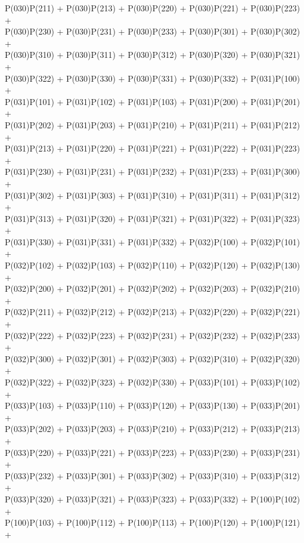 P(030)P(211) + P(030)P(213) + P(030)P(220) + P(030)P(221) + P(030)P(223) +\\
P(030)P(230) + P(030)P(231) + P(030)P(233) + P(030)P(301) + P(030)P(302) +\\
P(030)P(310) + P(030)P(311) + P(030)P(312) + P(030)P(320) + P(030)P(321) +\\
P(030)P(322) + P(030)P(330) + P(030)P(331) + P(030)P(332) + P(031)P(100) +\\
P(031)P(101) + P(031)P(102) + P(031)P(103) + P(031)P(200) + P(031)P(201) +\\
P(031)P(202) + P(031)P(203) + P(031)P(210) + P(031)P(211) + P(031)P(212) +\\
P(031)P(213) + P(031)P(220) + P(031)P(221) + P(031)P(222) + P(031)P(223) +\\
P(031)P(230) + P(031)P(231) + P(031)P(232) + P(031)P(233) + P(031)P(300) +\\
P(031)P(302) + P(031)P(303) + P(031)P(310) + P(031)P(311) + P(031)P(312) +\\
P(031)P(313) + P(031)P(320) + P(031)P(321) + P(031)P(322) + P(031)P(323) +\\
P(031)P(330) + P(031)P(331) + P(031)P(332) + P(032)P(100) + P(032)P(101) +\\
P(032)P(102) + P(032)P(103) + P(032)P(110) + P(032)P(120) + P(032)P(130) +\\
P(032)P(200) + P(032)P(201) + P(032)P(202) + P(032)P(203) + P(032)P(210) +\\
P(032)P(211) + P(032)P(212) + P(032)P(213) + P(032)P(220) + P(032)P(221) +\\
P(032)P(222) + P(032)P(223) + P(032)P(231) + P(032)P(232) + P(032)P(233) +\\
P(032)P(300) + P(032)P(301) + P(032)P(303) + P(032)P(310) + P(032)P(320) +\\
P(032)P(322) + P(032)P(323) + P(032)P(330) + P(033)P(101) + P(033)P(102) +\\
P(033)P(103) + P(033)P(110) + P(033)P(120) + P(033)P(130) + P(033)P(201) +\\
P(033)P(202) + P(033)P(203) + P(033)P(210) + P(033)P(212) + P(033)P(213) +\\
P(033)P(220) + P(033)P(221) + P(033)P(223) + P(033)P(230) + P(033)P(231) +\\
P(033)P(232) + P(033)P(301) + P(033)P(302) + P(033)P(310) + P(033)P(312) +\\
P(033)P(320) + P(033)P(321) + P(033)P(323) + P(033)P(332) + P(100)P(102) +\\
P(100)P(103) + P(100)P(112) + P(100)P(113) + P(100)P(120) + P(100)P(121) +\\
